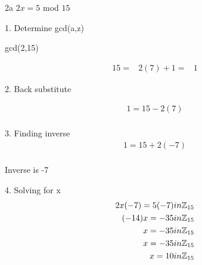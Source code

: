 \begin{question}{2a}
$2x = 5$ mod $15$

1. Determine gcd(a,z)

gcd(2,15)

\begin{align*}
15 =& 2(7) + 1
=& 1
\end{align*}

2. Back substitute

\begin{align*}
1 = 15 - 2(7)\\
\end{align*}

3. Finding inverse
\begin{align*}
1 = 15 + 2(-7)\\
\end{align*} 

Inverse is -7

4. Solving for x
\begin{align*}
2x(-7) = 5(-7) in \mathbb{Z}_{15}\\
(-14)x = -35 in \mathbb{Z}_{15}\\
x = -35 in \mathbb{Z}_{15}\\
x = -35 in \mathbb{Z}_{15}\\
x = 10 in \mathbb{Z}_{15}\\
\end{align*}
\end{question}

